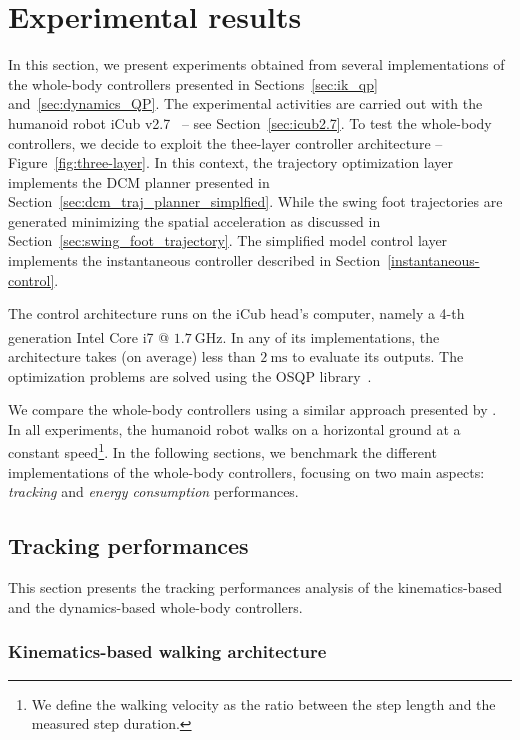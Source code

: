 \section{Experimental results}
\label{sec:wbc_experimental_results}
In this section, we present experiments obtained from several implementations of the whole-body controllers presented in Sections~\ref{sec:ik_qp} and~\ref{sec:dynamics_QP}. The experimental activities are carried out with the humanoid robot iCub v2.7~\citep{Metta2010} -- see Section~\ref{sec:icub2.7}.
To test the whole-body controllers, we decide to exploit the thee-layer controller architecture -- Figure~\ref{fig:three-layer}. In this context, the trajectory optimization layer implements the DCM planner presented in Section~\ref{sec:dcm_traj_planner_simplfied}. While the swing foot trajectories are generated minimizing the spatial acceleration as discussed in Section~\ref{sec:swing_foot_trajectory}. The simplified model control layer implements the instantaneous controller described in Section~\ref{instantaneous-control}.
\par
The control architecture runs on the iCub head's computer, namely a 4-th generation Intel\textsuperscript{\tiny\textregistered} Core i7 @ $\SI{1.7}{\giga \hertz}$. In any of its implementations, the architecture takes (on average) less than $\SI{2}{\milli \second}$ to evaluate its outputs. The optimization problems are solved using the OSQP library~\citep{Stellato2018}.

We compare the whole-body controllers using a similar approach presented by \cite{Torricelli2015BenchmarkingHumans}. In all experiments, the humanoid robot walks on a horizontal ground at a constant speed\footnote{We define the walking velocity as the ratio between the step length and the measured step duration.}.  
In the following sections, we benchmark the different implementations of the whole-body controllers, focusing on two main aspects: \emph{tracking} and \emph{energy consumption} performances. 

\subsection{Tracking performances}
This section presents the tracking performances analysis of the kinematics-based and the dynamics-based whole-body controllers. 

\subsubsection{Kinematics-based walking architecture}
\label{sec:kinematics-based_walking_architecture}

